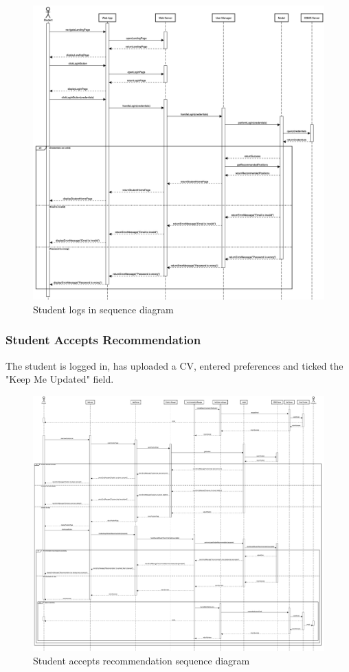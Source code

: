 \begin{figure}[h]
    \centering
    \includegraphics[width=16cm]{images/sequence-diagrams/student-logs-in.png}
    \caption{Student logs in sequence diagram}
\end{figure}

\clearpage
\subsubsection{Student Accepts Recommendation}
The student is logged in, has uploaded a CV, entered preferences and ticked the "Keep Me Updated" field.

\begin{figure}[h]
    \centering
    \includegraphics[width=16cm]{images/sequence-diagrams/student-accepts-recommendation.png}
    \caption{Student accepts recommendation sequence diagram}
\end{figure}

